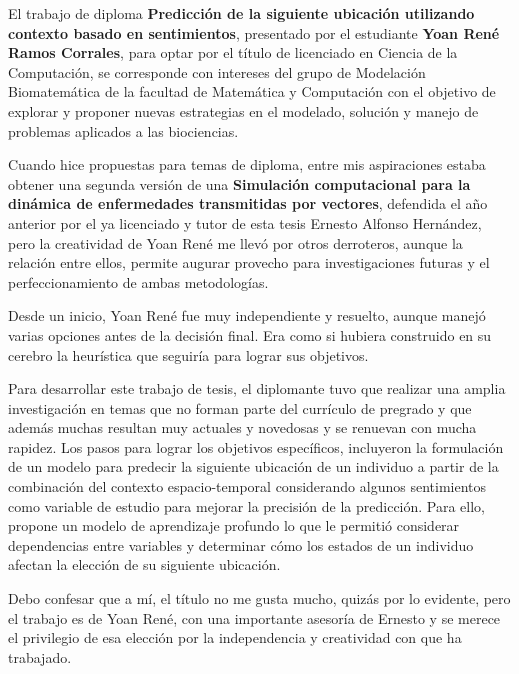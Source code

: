 \begin{opinion}

    El trabajo de diploma \textbf{Predicción de la siguiente ubicación utilizando contexto
    basado en sentimientos}, presentado por el estudiante \textbf{Yoan René Ramos
    Corrales}, para optar por el título de licenciado en Ciencia de la Computación, se
    corresponde con intereses del grupo de Modelación Biomatemática de la facultad
    de Matemática y Computación con el objetivo de explorar y proponer nuevas
    estrategias en el modelado, solución y manejo de problemas aplicados a las
    biociencias.

    Cuando hice propuestas para temas de diploma, entre mis aspiraciones estaba
    obtener una segunda versión de una \textbf{Simulación computacional para la
    dinámica de enfermedades transmitidas por vectores}, defendida el año
    anterior por el ya licenciado y tutor de esta tesis Ernesto Alfonso Hernández, pero
    la creatividad de Yoan René me llevó por otros derroteros, aunque la relación
    entre ellos, permite augurar provecho para investigaciones futuras y el
    perfeccionamiento de ambas metodologías.

    Desde un inicio, Yoan René fue muy independiente y resuelto, aunque manejó
    varias opciones antes de la decisión final. Era como si hubiera construido en su
    cerebro la heurística que seguiría para lograr sus objetivos.

    Para desarrollar este trabajo de tesis, el diplomante tuvo que realizar una amplia
    investigación en temas que no forman parte del currículo de pregrado y que
    además muchas resultan muy actuales y novedosas y se renuevan con mucha
    rapidez. Los pasos para lograr los objetivos específicos, incluyeron la formulación
    de un modelo para predecir la siguiente ubicación de un individuo a partir de la
    combinación del contexto espacio-temporal considerando algunos sentimientos
    como variable de estudio para mejorar la precisión de la predicción. Para ello,
    propone un modelo de aprendizaje profundo lo que le permitió considerar
    dependencias entre variables y determinar cómo los estados de un individuo
    afectan la elección de su siguiente ubicación.

    Debo confesar que a mí, el título no me gusta mucho, quizás por lo evidente, pero
    el trabajo es de Yoan René, con una importante asesoría de Ernesto y se merece
    el privilegio de esa elección por la independencia y creatividad con que ha
    trabajado.


\end{opinion}
